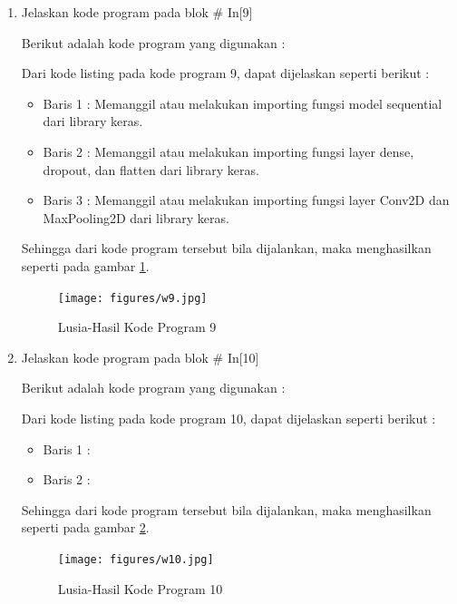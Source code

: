 \begin{enumerate}
\item Jelaskan kode program pada blok \# In[9]
	\par Berikut adalah kode program yang digunakan :
	
	\par Dari kode listing pada kode program 9, dapat dijelaskan seperti berikut :
	\begin{itemize}
	\item Baris 1	: Memanggil atau melakukan importing fungsi model sequential dari library keras.
	\item Baris 2	: Memanggil atau melakukan importing fungsi layer dense, dropout, dan flatten dari library keras.
	\item Baris 3	: Memanggil atau melakukan importing fungsi layer Conv2D dan MaxPooling2D dari library keras.
	\end{itemize}
	\par Sehingga dari kode program tersebut bila dijalankan, maka menghasilkan seperti pada gambar \ref{7B9}.
		\begin{figure}[!hbtp]
		\centering
		\texttt{[image: figures/w9.jpg]}
		\caption{Lusia-Hasil Kode Program 9}
		\label{7B9}
		\end{figure}

\item Jelaskan kode program pada blok \# In[10]
\par Berikut adalah kode program yang digunakan :
	
	\par Dari kode listing pada kode program 10, dapat dijelaskan seperti berikut :
	\begin{itemize}
	\item Baris 1	: 
	\item Baris 2	: 
	\end{itemize}
	\par Sehingga dari kode program tersebut bila dijalankan, maka menghasilkan seperti pada gambar \ref{7B10}.
		\begin{figure}[!hbtp]
		\centering
		\texttt{[image: figures/w10.jpg]}
		\caption{Lusia-Hasil Kode Program 10}
		\label{7B10}
		\end{figure}


\end{enumerate}
